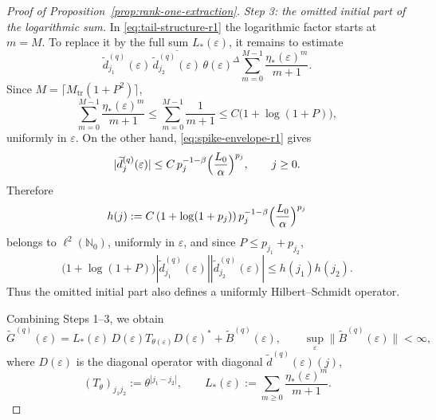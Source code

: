 \documentclass[11pt]{amsart}
\numberwithin{equation}{section}
\theoremstyle{plain}
\theoremstyle{definition}
\theoremstyle{remark}
\begin{document}
\begin{proof}[Proof of Proposition~\ref{prop:rank-one-extraction}]
\smallskip
\noindent
\textit{Step 3: the omitted initial part of the logarithmic sum.}
In \eqref{eq:tail-structure-r1} the logarithmic factor starts at \(m=M\). To
replace it by the full sum \(L_*(\varepsilon)\), it remains to estimate
\[
\widetilde d^{(q)}_{j_1}(\varepsilon)\,
\overline{\widetilde d^{(q)}_{j_2}(\varepsilon)}\,
\theta(\varepsilon)^\Delta
\sum_{m=0}^{M-1}\frac{\eta_*(\varepsilon)^m}{m+1}.
\]
Since \(M=\lceil M_{\mathrm{tr}}(1+P^2)\rceil\),
\[
\sum_{m=0}^{M-1}\frac{\eta_*(\varepsilon)^m}{m+1}
\le
\sum_{m=0}^{M-1}\frac1{m+1}
\le
C\bigl(1+\log(1+P)\bigr),
\]
uniformly in \(\varepsilon\). On the other hand,
\eqref{eq:spike-envelope-r1} gives
\[
|\widetilde d^{(q)}_j(\varepsilon)|
\le
C\,p_j^{-1-\beta}\Bigl(\frac{L_0}{\alpha}\Bigr)^{p_j},
\qquad j\ge0.
\]
Therefore
\[
h(j):=
C\,(1+\log(1+p_j))\,p_j^{-1-\beta}
\Bigl(\frac{L_0}{\alpha}\Bigr)^{p_j}
\]
belongs to \(\ell^2(\mathbb N_0)\), uniformly in \(\varepsilon\), and since
\(P\le p_{j_1}+p_{j_2}\),
\[
\bigl(1+\log(1+P)\bigr)
|\widetilde d^{(q)}_{j_1}(\varepsilon)|
|\widetilde d^{(q)}_{j_2}(\varepsilon)|
\le
h(j_1)h(j_2).
\]
Thus the omitted initial part also defines a uniformly Hilbert--Schmidt
operator.

Combining Steps 1--3, we obtain
\begin{equation}\label{eq:tail-toeplitz-r1}
\widetilde G^{(q)}(\varepsilon)
=
L_*(\varepsilon)\,
D(\varepsilon)T_{\theta(\varepsilon)}D(\varepsilon)^*
+
\widetilde B^{(q)}(\varepsilon),
\qquad
\sup_{\varepsilon}\|\widetilde B^{(q)}(\varepsilon)\|<\infty,
\end{equation}
where \(D(\varepsilon)\) is the diagonal operator with diagonal
\(\widetilde d^{(q)}(\varepsilon)(j)\),
\[
(T_{\theta})_{j_1j_2}:=\theta^{|j_1-j_2|},
\qquad
L_*(\varepsilon):=\sum_{m\ge0}\frac{\eta_*(\varepsilon)^m}{m+1}.
\]


\end{proof}
\end{document}
